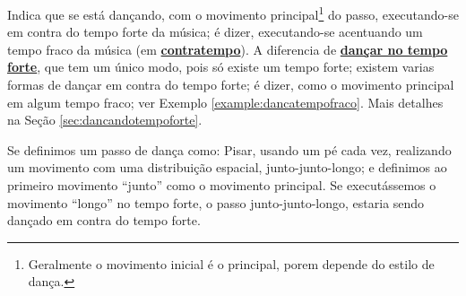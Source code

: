 \begin{definition} 
\label{def:DancaNoContratempo}
Indica que se está dançando, com o movimento principal\footnote{Geralmente o movimento inicial é o principal,
porem depende do estilo de dança.} do passo, 
executando-se em contra do tempo forte da música; é dizer, 
executando-se acentuando um tempo fraco da música (em \hyperref[sec:contratempo]{\textbf{contratempo}}).
A diferencia de \hyperref[def:DancaNoTempo]{\textbf{dançar no tempo forte}}, 
que tem um único modo, pois só existe um tempo forte;
existem varias formas de dançar em contra do tempo forte;
é dizer, como o movimento principal em algum tempo fraco; ver Exemplo \ref{example:dancatempofraco}.
Mais detalhes na Seção \ref{sec:dancandotempoforte}.
\end{definition}
\begin{example}
\label{example:dancatempofraco}
Se definimos um passo de dança como: Pisar, usando um pé cada vez, 
realizando um movimento com uma distribuição espacial, junto-junto-longo;
e definimos ao primeiro movimento ``junto'' como o movimento principal. 
Se executássemos o movimento ``longo'' no tempo forte, o passo junto-junto-longo,
estaria sendo dançado em contra do tempo forte.
\end{example}
